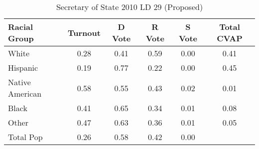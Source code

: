 \begin{table}[htb]
\begin{center}
\caption{Secretary of State 2010 LD 29 (Proposed)}
\label{sos10_cvap_ld_29}
\begin{tabular}{lccccc}
  \hline
Racial Group & Turnout & D Vote & R Vote & S Vote & Total CVAP \\ 
  \hline
White & 0.28 & 0.41 & 0.59 & 0.00 & 0.41 \\ 
  Hispanic & 0.19 & 0.77 & 0.22 & 0.00 & 0.45 \\ 
  Native American & 0.58 & 0.55 & 0.43 & 0.02 & 0.01 \\ 
  Black & 0.41 & 0.65 & 0.34 & 0.01 & 0.08 \\ 
  Other & 0.47 & 0.63 & 0.36 & 0.01 & 0.05 \\ 
  Total Pop & 0.26 & 0.58 & 0.42 & 0.00 &  \\ 
   \hline
\end{tabular}
\end{center}
\end{table}
